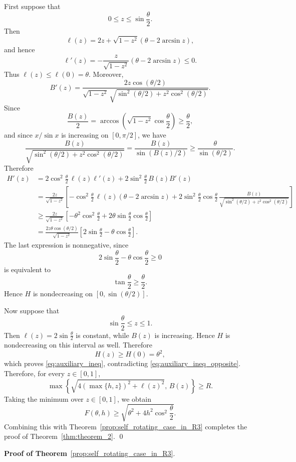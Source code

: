 \documentclass[a4paper,12pt,reqno]{amsart}
\begin{document}
First suppose that
\[
0\le z\le \sin\frac{\theta}{2}.
\]
Then
\[
\ell(z)=2z+\sqrt{1-z^2}\left(\theta-2\arcsin z\right),
\]
and hence
\[
\ell'(z)
=
-\frac{z}{\sqrt{1-z^2}}\left(\theta-2\arcsin z\right)\le 0.
\]
Thus \(\ell(z)\le \ell(0)=\theta\). Moreover,
\[
B'(z)
=
\frac{2z\cos(\theta/2)}
{\sqrt{1-z^2}\,
\sqrt{\sin^2(\theta/2)+z^2\cos^2(\theta/2)}}.
\]
Since
\[
\frac{B(z)}{2}
=
\arccos\left(\sqrt{1-z^2}\cos\frac{\theta}{2}\right)
\ge \frac{\theta}{2},
\]
and since \(x/\sin x\) is increasing on \([0,\pi/2]\), we have
\[
\frac{B(z)}
{\sqrt{\sin^2(\theta/2)+z^2\cos^2(\theta/2)}}
=
\frac{B(z)}{\sin(B(z)/2)}
\ge
\frac{\theta}{\sin(\theta/2)}.
\]
Therefore
\[
\begin{aligned}
H'(z)
&=
2\cos^2\frac{\theta}{2}\,\ell(z)\ell'(z)
+
2\sin^2\frac{\theta}{2}\,B(z)B'(z) \\
&=
\frac{2z}{\sqrt{1-z^2}}
\left[
-\cos^2\frac{\theta}{2}\,\ell(z)\left(\theta-2\arcsin z\right)
+
2\sin^2\frac{\theta}{2}\cos\frac{\theta}{2}\,
\frac{B(z)}
{\sqrt{\sin^2(\theta/2)+z^2\cos^2(\theta/2)}}
\right] \\
&\ge
\frac{2z}{\sqrt{1-z^2}}
\left[
-\theta^2\cos^2\frac{\theta}{2}
+
2\theta\sin\frac{\theta}{2}\cos\frac{\theta}{2}
\right] \\
&=
\frac{2z\theta\cos(\theta/2)}{\sqrt{1-z^2}}
\left[
2\sin\frac{\theta}{2}-\theta\cos\frac{\theta}{2}
\right].
\end{aligned}
\]
The last expression is nonnegative, since
\[
2\sin\frac{\theta}{2}-\theta\cos\frac{\theta}{2}\ge0
\]
is equivalent to
\[
\tan\frac{\theta}{2}\ge \frac{\theta}{2}.
\]
Hence \(H\) is nondecreasing on \([0,\sin(\theta/2)]\).

Now suppose that
\[
\sin\frac{\theta}{2}\le z\le 1.
\]
Then $\displaystyle \ell(z)=2\sin\frac{\theta}{2}$ is constant, while \(B(z)\) is increasing. Hence \(H\) is nondecreasing on this interval as well. Therefore
\[
H(z)\ge H(0)=\theta^2,
\]
which proves \eqref{eq:auxiliary_ineq}, contradicting \eqref{eq:auxiliary_ineq_opposite}. Therefore, for every \(z\in[0,1]\),
\[
\max\left\{
\sqrt{4\left(\max\{h,z\}\right)^2+\ell(z)^2},
\,B(z)
\right\}
\ge R.
\]
Taking the minimum over \(z\in[0,1]\), we obtain
\[
F(\theta,h)\ge \sqrt{\theta^2+4h^2\cos^2\frac{\theta}{2}}.
\]
Combining this with Theorem~\ref{prop:self_rotating_case_in_R3} completes the proof of Theorem~\ref{thm:theorem_2}.
\qed

\medskip
\noindent \textbf{Proof of Theorem}~\ref{prop:self_rotating_case_in_R3}.
\end{document}
